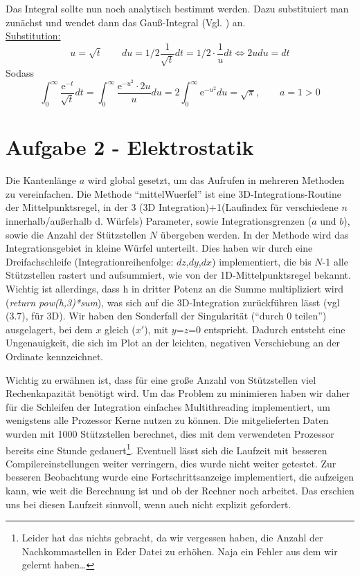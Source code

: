 Das Integral sollte nun noch analytisch bestimmt werden. Dazu substituiert man zunächst und wendet
dann das Gauß-Integral (Vgl. \cite{wiki}) an.\\
\underline{Substitution:}
\begin{equation*}
u = \sqrt{t} \qquad du = 1/2 \frac{1}{\sqrt{t}} dt = 1/2 \cdot \frac{1}{u} dt \Leftrightarrow 2udu = dt
\end{equation*}
Sodass
\begin{equation*}
\int_0^{\infty} \frac{\mathup{e}^{-t}}{\sqrt{t}} dt = \int_0^{\infty} \frac{\mathup{e}^{-u^2}\cdot 2u}{u} du = 2 \int_0^{\infty} \mathup{e}^{-u^2} du = \sqrt{\pi}, \qquad a=1>0
\end{equation*}




\section*{Aufgabe 2 - Elektrostatik}
Die Kantenlänge $a$ wird global gesetzt, um das Aufrufen in mehreren Methoden zu vereinfachen. Die
Methode \enquote{mittelWuerfel} ist eine 3D-Integrations-Routine der Mittelpunktsregel, in der 3 (3D
Integration)+1(Laufindex für verschiedene $n$ innerhalb/außerhalb d. Würfels) Parameter, sowie
Integrationsgrenzen ($a$ und $b$), sowie die Anzahl der Stützstellen $N$ übergeben werden. In der
Methode wird das Integrationsgebiet in kleine Würfel unterteilt. Dies haben wir durch eine
Dreifachschleife (Integrationreihenfolge: $dz$,$dy$,$dx$) implementiert, die bis $N$-1 alle
Stützstellen rastert und aufsummiert, wie von der 1D-Mittelpunktsregel bekannt. Wichtig ist
allerdings, dass h in dritter Potenz an die Summe multipliziert wird (\textit{return pow(h,3)*sum}),
was sich auf die 3D-Integration zurückführen lässt (vgl (3.7)\cite[32]{script}, für 3D).  Wir haben
den Sonderfall der Singularität (\enquote{durch 0 teilen}) ausgelagert, bei dem $x$ gleich ($x'$),
mit $y$=$z$=0 entspricht. Dadurch entsteht eine Ungenauigkeit, die sich im Plot an der leichten,
negativen Verschiebung an der Ordinate kennzeichnet.

Wichtig zu erwähnen ist, dass für eine große Anzahl von Stützstellen viel Rechenkapazität benötigt
wird. Um das Problem zu minimieren haben wir daher für die Schleifen der Integration einfaches
Multithreading implementiert, um wenigstens alle Prozessor Kerne nutzen zu können. Die mitgelieferten
Daten wurden mit 1000 Stützstellen berechnet, dies mit dem verwendeten Prozessor bereits eine Stunde
gedauert\footnote{Leider hat das nichts gebracht, da wir vergessen haben, die Anzahl der Nachkommastellen in
Eder Datei zu erhöhen. Naja ein Fehler aus dem wir gelernt haben\ldots}. 
Eventuell lässt sich die Laufzeit mit besseren Compilereinstellungen weiter verringern,
dies wurde nicht weiter getestet. Zur besseren Beobachtung wurde eine Fortschrittsanzeige implementiert, die
aufzeigen kann, wie weit die Berechnung ist und ob der Rechner noch arbeitet. Das erschien uns
bei diesen Laufzeit sinnvoll, wenn auch nicht explizit gefordert.

